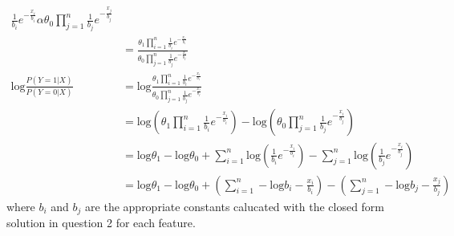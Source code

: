 \documentclass{article}
\begin{document}
\begin{enumerate}
\begin{enumerate}
\begin{align*}
{                            \frac{1}{b_i} e^{-\frac{x_i}{b_i}}}
                        {\alpha \theta_0 \prod\limits_{j=1}^n
                            \frac{1}{b_j} e^{-\frac{x_j}{b_j}}} \\
                    &= \frac
                        {\theta_1 \prod\limits_{i=1}^n
                            \frac{1}{b_i} e^{-\frac{x_i}{b_i}}}
                        {\theta_0 \prod\limits_{j=1}^n
                            \frac{1}{b_j} e^{-\frac{x_i}{b_j}}} \\
                    \text{log} \frac{P(Y=1|X)}{P(Y=0|X)}
                    &= \text{log} \frac
                        {\theta_1 \prod\limits_{i=1}^n
                            \frac{1}{b_i} e^{-\frac{x_i}{b_i}}}
                        {\theta_0 \prod\limits_{j=1}^n
                            \frac{1}{b_j} e^{-\frac{x_i}{b_j}}} \\
                    &= \text{log} \left( \theta_1 \prod\limits_{i=1}^n
                            \frac{1}{b_i} e^{-\frac{x_i}{b_i}} \right) -
                        \text{log} \left( \theta_0 \prod\limits_{j=1}^n
                            \frac{1}{b_j} e^{-\frac{x_i}{b_j}} \right) \\
                    &= \text{log} \theta_1 - \text{log} \theta_0 +
                        \sum\limits_{i=1}^n \text{log} \left( \frac{1}{b_i} 
                            e^{-\frac{x_i}{b_i}} \right) -
                        \sum\limits_{j=1}^n \text{log} \left( \frac{1}{b_j}
                            e^{-\frac{x_i}{b_j}} \right) \\
                    &=  \text{log} \theta_1 - \text{log} \theta_0 +
                        \left( \sum\limits_{i=1}^n -\text{log} b_i - 
                            \frac{x_i}{b_i} \right)
                         - \left( \sum\limits_{j=1}^n - \text{log} b_j - 
                            \frac{x_j}{b_j} \right)
                \end{align*}
                where \(b_i\) and \(b_j\) are the appropriate constants
                calucated with the closed form solution in question 2 for
                each feature.
        \end{enumerate}
\end{enumerate}
\end{document}
